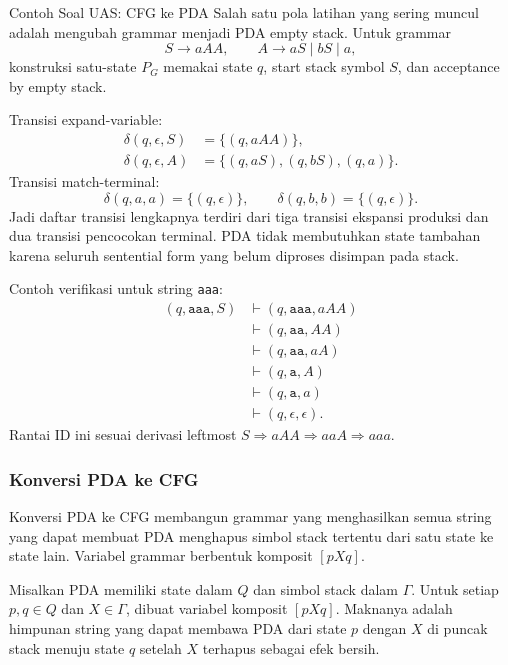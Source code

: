 \begin{cmt}{Contoh Soal UAS: CFG ke PDA}{}
Salah satu pola latihan yang sering muncul adalah mengubah grammar menjadi PDA empty stack. Untuk grammar
\[
    S\rightarrow aAA,\qquad A\rightarrow aS\mid bS\mid a,
\]
konstruksi satu-state $P_G$ memakai state $q$, start stack symbol $S$, dan acceptance by empty stack.

Transisi expand-variable:
\[
\begin{aligned}
    \delta(q,\epsilon,S) &= \{(q,aAA)\},\\
    \delta(q,\epsilon,A) &= \{(q,aS),(q,bS),(q,a)\}.
\end{aligned}
\]
Transisi match-terminal:
\[
    \delta(q,a,a)=\{(q,\epsilon)\},\qquad
    \delta(q,b,b)=\{(q,\epsilon)\}.
\]
Jadi daftar transisi lengkapnya terdiri dari tiga transisi ekspansi produksi dan dua transisi pencocokan terminal. PDA tidak membutuhkan state tambahan karena seluruh sentential form yang belum diproses disimpan pada stack.

Contoh verifikasi untuk string \texttt{aaa}:
\[
\begin{aligned}
    (q,\texttt{aaa},S)
    &\vdash (q,\texttt{aaa},aAA)\\
    &\vdash (q,\texttt{aa},AA)\\
    &\vdash (q,\texttt{aa},aA)\\
    &\vdash (q,\texttt{a},A)\\
    &\vdash (q,\texttt{a},a)\\
    &\vdash (q,\epsilon,\epsilon).
\end{aligned}
\]
Rantai ID ini sesuai derivasi leftmost $S\Rightarrow aAA\Rightarrow aaA\Rightarrow aaa$.
\end{cmt}

\subsubsection{Konversi PDA ke CFG}

\begin{jawab}
Konversi PDA ke CFG membangun grammar yang menghasilkan semua string yang dapat membuat PDA menghapus simbol stack tertentu dari satu state ke state lain. Variabel grammar berbentuk komposit $[pXq]$.
\end{jawab}

Misalkan PDA memiliki state dalam $Q$ dan simbol stack dalam $\Gamma$. Untuk setiap $p,q\in Q$ dan $X\in\Gamma$, dibuat variabel komposit $[pXq]$. Maknanya adalah himpunan string yang dapat membawa PDA dari state $p$ dengan $X$ di puncak stack menuju state $q$ setelah $X$ terhapus sebagai efek bersih.

